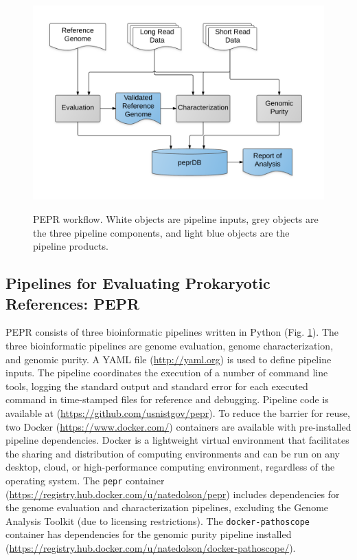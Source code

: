 \documentclass[smallextended]{svjour3}\usepackage[]{graphicx}\usepackage[]{color}
\begin{document}
\begin{figure}
\includegraphics[width=\textwidth]{pepr-workflow.png}
\label{fig:workflowFig}
\caption{PEPR workflow. White objects are pipeline inputs, grey objects are the three pipeline components, and light blue objects are the pipeline products.}
\end{figure}


\subsection{Pipelines for Evaluating Prokaryotic References: PEPR}
PEPR consists of three bioinformatic pipelines written in Python (Fig. \ref{fig:workflowFig}). 
The three bioinformatic pipelines are genome evaluation, genome characterization, and genomic purity. 
A YAML file (\url{http://yaml.org}) is used to define pipeline inputs. 
The pipeline coordinates the execution of a number of command line tools, logging the standard output and standard error for each executed command in time-stamped files for reference and debugging. 
Pipeline code is available at (\url{https://github.com/usnistgov/pepr}). 
To reduce the barrier for reuse, two Docker (\url{https://www.docker.com/}) containers are available with pre-installed pipeline dependencies. 
Docker is a lightweight virtual environment that facilitates the sharing and distribution of computing environments and can be run on any desktop, cloud, or high-performance computing environment, regardless of the operating system. 
The \texttt{pepr} container (\url{https://registry.hub.docker.com/u/natedolson/pepr}) includes dependencies for the genome evaluation and characterization pipelines, excluding the Genome Analysis Toolkit (due to licensing restrictions). 
The \texttt{docker-pathoscope} container has dependencies for the genomic purity pipeline installed (\url{https://registry.hub.docker.com/u/natedolson/docker-pathoscope/}).
\end{document}

